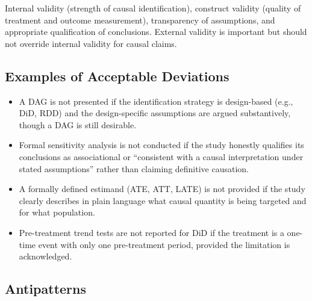 Internal validity (strength of causal identification), construct validity (quality of treatment and outcome measurement), transparency of assumptions, and appropriate qualification of conclusions.
External validity is important but should not override internal validity for causal claims.

\subsection{Examples of Acceptable Deviations}

\begin{itemize}[leftmargin=15pt]
    \item A DAG is not presented if the identification strategy is design-based (e.g., DiD, RDD) and the design-specific assumptions are argued substantively, though a DAG is still desirable.
    \item Formal sensitivity analysis is not conducted if the study honestly qualifies its conclusions as associational or ``consistent with a causal interpretation under stated assumptions'' rather than claiming definitive causation.
    \item A formally defined estimand (ATE, ATT, LATE) is not provided if the study clearly describes in plain language what causal quantity is being targeted and for what population.
    \item Pre-treatment trend tests are not reported for DiD if the treatment is a one-time event with only one pre-treatment period, provided the limitation is acknowledged.
\end{itemize}

\subsection{Antipatterns}

